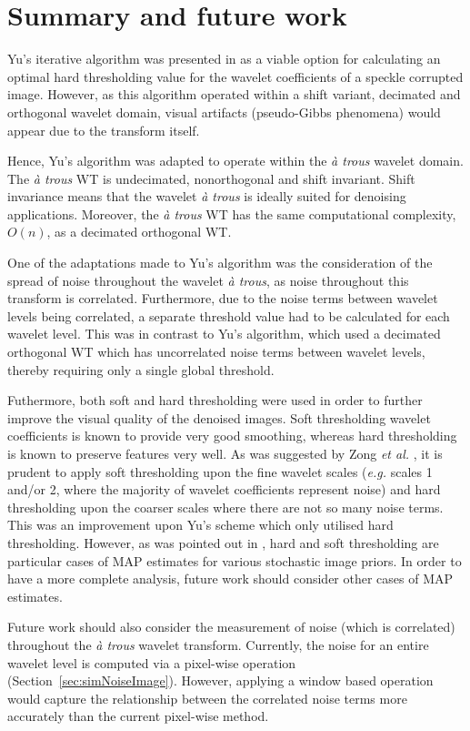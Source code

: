 \documentclass[12pt]{report}
\begin{document}
\section{Summary and future work}
Yu's iterative algorithm was presented in \cite{yu96} as a viable option for calculating an optimal hard thresholding value
for the wavelet coefficients of a speckle corrupted image. 
However, as this algorithm operated within a shift variant, decimated and orthogonal wavelet domain,
visual artifacts (pseudo-Gibbs phenomena) would appear due to the transform itself.

Hence, Yu's algorithm was adapted to operate within the \emph{\`a trous} wavelet domain. 
The \emph{\`a trous} WT is undecimated, nonorthogonal and shift invariant. Shift invariance
means that the wavelet \emph{\`a trous} is ideally suited for denoising applications.
Moreover, the \emph{\`a trous} WT has the same computational complexity, $O(n)$, as a
decimated orthogonal WT.

One of the adaptations made to Yu's algorithm was the consideration of the spread of noise throughout the wavelet \emph{\`a trous},
as noise throughout this transform is correlated. Furthermore, due to the noise terms between wavelet 
levels being correlated, a separate threshold value had to be calculated for each wavelet level.
This was in contrast to Yu's algorithm, which used a decimated orthogonal WT
which has uncorrelated noise terms between wavelet levels, thereby requiring only a single global threshold.

Futhermore, both soft and hard thresholding were used in order to 
further improve the visual quality of the denoised images. 
Soft thresholding wavelet coefficients is known to provide very good smoothing, whereas hard thresholding is
known to preserve features very well. As was suggested by Zong \emph{et al.} \cite{zong98}, it is prudent 
to apply soft thresholding upon the fine wavelet scales (\emph{e.g.} scales 1 and/or 2, where the majority of wavelet 
coefficients represent noise) and hard thresholding upon the coarser scales where there are not so many noise terms. 
This was an improvement upon Yu's
scheme which only utilised hard thresholding.
However, as was pointed out in \cite{moulinLiu}, hard and soft thresholding are particular cases of MAP 
estimates for various stochastic image priors. In order to have a more complete analysis,
future work should consider other cases of MAP estimates.

Future work should also consider the measurement of noise (which is correlated) throughout the 
\emph{\`a trous} wavelet transform. Currently, the noise for an entire wavelet level is computed
via a pixel-wise operation (Section~\ref{sec:simNoiseImage}). However, applying a window based operation
would capture the relationship between the correlated noise terms more accurately
than the current pixel-wise method.
\end{document}
